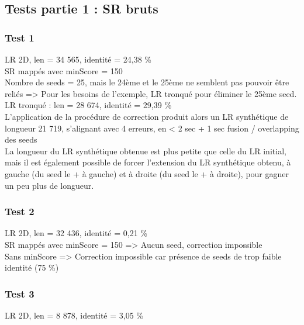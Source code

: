 \documentclass[12pt]{article}
\begin{document}
\subsection{Tests partie 1 : SR bruts}

\subsubsection{Test 1}

LR 2D, len = 34 565, identité = 24,38 \% \\

SR mappés avec minScore = 150 \\

Nombre de seeds = 25, mais le 24ème et le 25ème ne semblent pas pouvoir être reliés => Pour les besoins de l'exemple, LR tronqué pour éliminer le 25ème seed. \\

LR tronqué : len = 28 674, identité = 29,39 \% \\

L'application de la procédure de correction produit alors un LR synthétique de longueur 21 719, s'alignant avec 4 erreurs, en < 2 sec + 1 sec fusion / overlapping des seeds \\

La longueur du LR synthétique obtenue est plus petite que celle du LR initial, mais il est également possible de forcer l'extension du LR synthétique obtenu, à gauche (du seed le + à gauche) et à droite (du seed le + à droite), pour gagner un peu plus de longueur. \\

\subsubsection{Test 2}

LR 2D, len = 32 436, identité = 0,21 \% \\

SR mappés avec minScore = 150 => Aucun seed, correction impossible \\

Sans minScore => Correction impossible car présence de seeds de trop faible identité (75 \%)

\subsubsection{Test 3}

LR 2D, len = 8 878, identité = 3,05 \% \\
\end{document}
